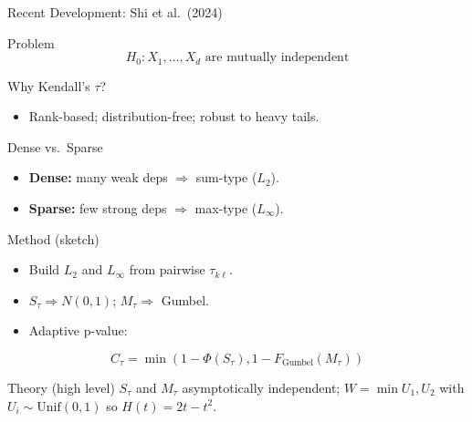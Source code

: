 \documentclass[
  ignorenonframetext,
]{beamer}
\providecommand{\tightlist}{%
  \setlength{\itemsep}{0pt}\setlength{\parskip}{0pt}}
\begin{document}
\begin{frame}[allowframebreaks]{Recent Development: Shi et al.~(2024)}
\label{recent-development-shi-et-al.-2024}
\begin{block}{Problem}
\label{problem}
\[
H_0: X_1,\dots,X_d \text{ are mutually independent}
\]
\end{block}

\begin{block}{Why Kendall's \(\tau\)?}
\label{why-kendalls-tau}
\begin{itemize}
\tightlist
\item
  Rank-based; distribution-free; robust to heavy tails.
\end{itemize}
\end{block}

\begin{block}{Dense vs.~Sparse}
\label{dense-vs.-sparse}
\begin{itemize}
\tightlist
\item
  \textbf{Dense:} many weak deps \(\Rightarrow\) sum-type (\(L_2\)).
\item
  \textbf{Sparse:} few strong deps \(\Rightarrow\) max-type
  (\(L_\infty\)).
\end{itemize}
\end{block}

\begin{block}{Method (sketch)}
\label{method-sketch}
\begin{itemize}
\tightlist
\item
  Build \(L_2\) and \(L_\infty\) from pairwise \(\tau_{k\ell}\).
\item
  \(S_\tau \Rightarrow N(0,1)\); \(M_\tau \Rightarrow\) Gumbel.
\item
  Adaptive p-value:
\end{itemize}

\[
C_\tau=\min{(1-\Phi(S_\tau), 1-F_{\mathrm{Gumbel}}(M_\tau))}
\]
\end{block}

\begin{block}{Theory (high level)}
\label{theory-high-level}
\(S_\tau\) and \(M_\tau\) asymptotically independent;
\(W=\min{U_1,U_2}\) with \(U_i\sim \mathrm{Unif}(0,1)\) so
\(H(t)=2t-t^2\).
\end{block}
\end{frame}
\end{document}
